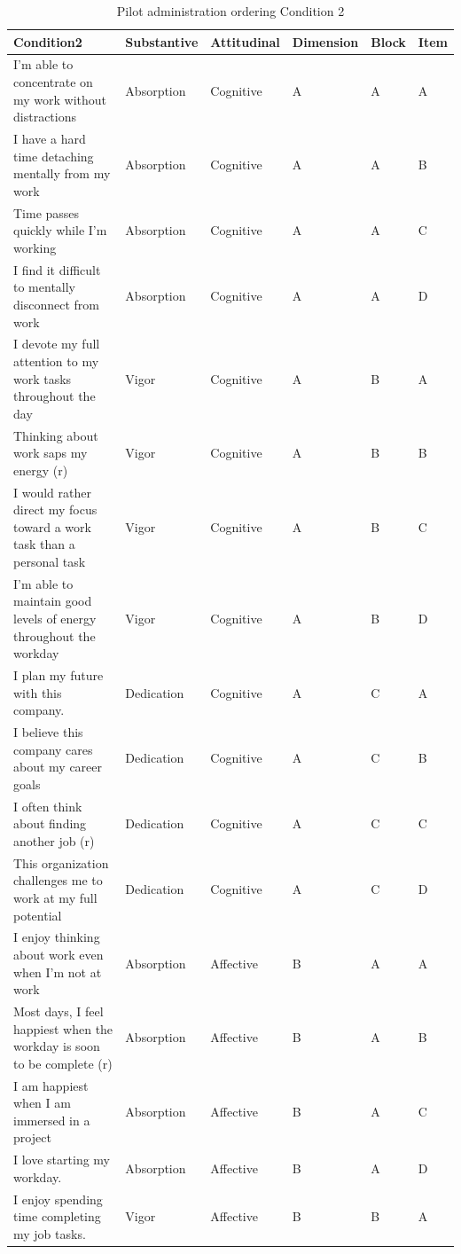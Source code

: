 \documentclass[
]{book}
\begin{document}
\begin{table}

\caption{\label{tab:conditions}Pilot administration ordering Condition 2}
\centering
\begin{tabular}[t]{l|l|l|l|l|l}
\hline
Condition2 & Substantive & Attitudinal & Dimension & Block & Item\\
\hline
I’m able to concentrate on my work without distractions & Absorption & Cognitive & A & A & A\\
\hline
I have a hard time detaching mentally from my work & Absorption & Cognitive & A & A & B\\
\hline
Time passes quickly while I’m working & Absorption & Cognitive & A & A & C\\
\hline
I find it difficult to mentally disconnect from work & Absorption & Cognitive & A & A & D\\
\hline
I devote my full attention to my work tasks throughout the day & Vigor & Cognitive & A & B & A\\
\hline
Thinking about work saps my energy (r) & Vigor & Cognitive & A & B & B\\
\hline
I would rather direct my focus toward a work task than a personal task & Vigor & Cognitive & A & B & C\\
\hline
I’m able to maintain good levels of energy throughout the workday & Vigor & Cognitive & A & B & D\\
\hline
I plan my future with this company. & Dedication & Cognitive & A & C & A\\
\hline
I believe this company cares about my career goals & Dedication & Cognitive & A & C & B\\
\hline
I often think about finding another job (r) & Dedication & Cognitive & A & C & C\\
\hline
This organization challenges me to work at my full potential & Dedication & Cognitive & A & C & D\\
\hline
I enjoy thinking about work even when I’m not at work & Absorption & Affective & B & A & A\\
\hline
Most days, I feel happiest when the workday is soon to be complete (r) & Absorption & Affective & B & A & B\\
\hline
I am happiest when I am immersed in a project & Absorption & Affective & B & A & C\\
\hline
I love starting my workday. & Absorption & Affective & B & A & D\\
\hline
I enjoy spending time completing my job tasks. & Vigor & Affective & B & B & A\\

\end{tabular}
\end{table}
\end{document}
